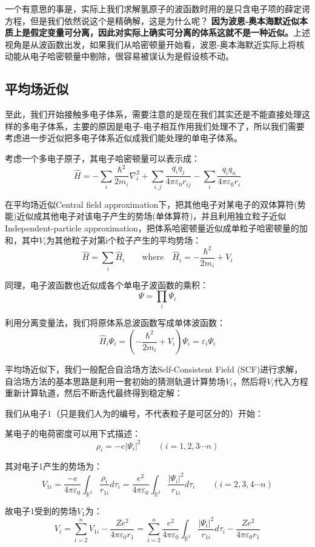 一个有意思的事是，实际上我们求解氢原子的波函数时用的是只含电子项的薛定谔方程，但是我们依然说这个是精确解，这是为什么呢？
\textbf{因为波恩-奥本海默近似本质上是假定变量可分离，因此对实际上确实可分离的体系这就不是一种近似。}上述视角是从波函数出发，如果我们从哈密顿量开始看，波恩-奥本海默近实际上将核动能从电子哈密顿量中剔除，很容易被误认为是假设核不动。

\subsection{平均场近似}
至此，我们开始接触多电子体系，需要注意的是现在我们其实还是不能直接处理这样的多电子体系，主要的原因是电子-电子相互作用我们处理不了，所以我们需要考虑进一步近似把多电子体系近似成我们能处理的单电子体系。

考虑一个多电子原子，其电子哈密顿量可以表示成：
\[\hat{H}=-\sum_{i}\frac{\hbar^2}{2m_i}\nabla^2_i+\sum_{i,j}\frac{q_iq_j}{4 \pi \varepsilon_0 r_{ij}}-\sum_i\frac{q_iq_n}{4 \pi \varepsilon_0 r_{i}}\]

在平均场近似Central field approximation下，把其他电子对某电子的双体算符(势能)近似成其他电子对该电子产生的势场(单体算符)，并且利用独立粒子近似Independent-particle approximation，把体系哈密顿量近似成单粒子哈密顿量的加和，其中$V_i$为其他粒子对第i个粒子产生的平均势场：
\[\hat{H}=\sum_{i}\hat{H}_{i} \qquad \text{where} \quad \hat{H}_i=-\frac{\hbar^2}{2m_i}+V_i\]

同理，电子波函数也近似成各个单电子波函数的乘积：
\[\varPsi=\prod_i\varPsi_i\]

利用分离变量法，我们将原体系总波函数写成单体波函数：
\[\hat{H}_i\varPsi_i=\left ( -\frac{\hbar^2}{2m_i}+V_i \right ) \varPsi_i=\varepsilon_i\varPsi_i\]

平均场近似下，我们一般配合自洽场方法Self-Consistent Field (SCF)进行求解，自洽场方法的基本思路是利用一套初始的猜测轨道计算势场$V_i$，然后将$V_i$代入方程重新计算轨道，然后不断迭代最终得到稳定解：

我们从电子1（只是我们人为的编号，不代表粒子是可区分的）开始：

某电子的电荷密度可以用下式描述：
\[\rho_i=-e|\varPsi_i|^2 \qquad (i=1,2,3 \cdots n)\]

其对电子1产生的势场为：
\[V_{1i}=\frac{-e}{4 \pi \varepsilon_0}\int_{\mathbb{R}^3}\frac{\rho_i}{r_{1i}}d\tau_i=\frac{e^2}{4 \pi \varepsilon_0}\int_{\mathbb{R}^3}\frac{|\varPsi_i|^2}{r_{1i}}d\tau_i \qquad (i=2,3,4 \cdots n)\]

故电子1受到的势场$V_1$为：
\[V_i=\sum_{i=2}^nV_{1i}-\frac{Ze^2}{4 \pi \varepsilon_0r_1}=\sum_{i=2}^n\frac{e^2}{4 \pi \varepsilon_0}\int_{\mathbb{R}^3}\frac{|\varPsi_i|^2}{r_{1i}}d\tau_i-\frac{Ze^2}{4 \pi \varepsilon_0r_1}\]


